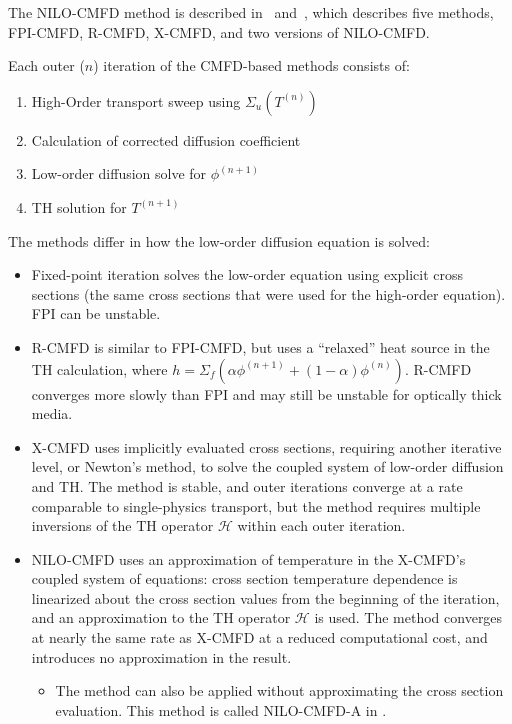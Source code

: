 \documentclass{proposal}
\newcommand{\calH}{\mathcal{H}}
\begin{document}
The NILO-CMFD method is described in~\cite{adamowicz2023nilo} and~\cite{adamowicz2021nilo}, which describes five methods, FPI-CMFD, R-CMFD, X-CMFD, and two versions of NILO-CMFD.

Each outer ($n$) iteration of the CMFD-based methods consists of:

\begin{enumerate}
    \item High-Order transport sweep using $\Sigma_u(T^{(n)})$
    \item Calculation of corrected diffusion coefficient
    \item Low-order diffusion solve for $\phi^{(n+1)}$
    \item TH solution for $T^{(n+1)}$
\end{enumerate}

The methods differ in how the low-order diffusion equation is solved:

\begin{itemize}
    \item Fixed-point iteration solves the low-order equation using explicit cross sections (the same cross sections that were used for the high-order equation). FPI can be unstable.
    \item R-CMFD is similar to FPI-CMFD, but uses a ``relaxed'' heat source in the TH calculation, where $h = \Sigma_f (\alpha \phi^{(n+1)} + (1-\alpha)\phi^{(n)})$. R-CMFD converges more slowly than FPI and may still be unstable for optically thick media.
    \item X-CMFD uses implicitly evaluated cross sections, requiring another iterative level, or Newton's method, to solve the coupled system of low-order diffusion and TH. The method is stable, and outer iterations converge at a rate comparable to single-physics transport, but the method requires multiple inversions of the TH operator $\calH$ within each outer iteration.
    \item NILO-CMFD uses an approximation of temperature in the X-CMFD's coupled system of equations: cross section temperature dependence is linearized about the cross section values from the beginning of the iteration, and an approximation to the TH operator $\calH$ is used. The method converges at nearly the same rate as X-CMFD at a reduced computational cost, and introduces no approximation in the result.
    \begin{itemize}
        \item The method can also be applied without approximating the cross section evaluation. This method is called NILO-CMFD-A in \cite{adamowicz2023nilo}.
    \end{itemize}
\end{itemize}
\end{document}
